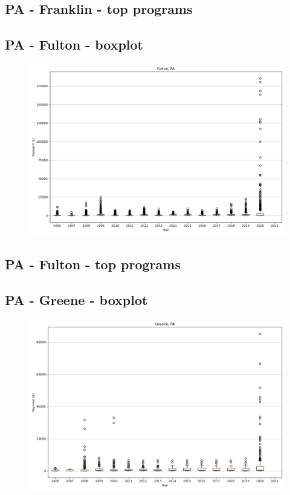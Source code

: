 \subsection*{PA - Franklin - top programs}

\newpage
\subsection*{PA - Fulton - boxplot}
\begin{figure}[h]
\centering
\includegraphics[width=7in]{../output/boxplots/counties/Fulton-PA_boxplot.png}
\end{figure}


\subsection*{PA - Fulton - top programs}

\newpage
\subsection*{PA - Greene - boxplot}
\begin{figure}[h]
\centering
\includegraphics[width=7in]{../output/boxplots/counties/Greene-PA_boxplot.png}
\end{figure}


